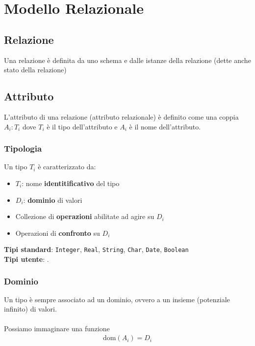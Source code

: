 \chapter{Modello Relazionale}

\section{Relazione}
Una {relazione} è definita da uno {schema} e dalle {istanze} della relazione (dette anche {stato} della relazione)

\section{Attributo}
L'attributo di una relazione (attributo relazionale) è definito come una coppia $A_i:T_i$ dove $T_i$ è il tipo dell'attributo e $A_i$ è il nome dell'attributo.

\subsection{Tipologia}
Un tipo $T_i$ è caratterizzato da:
    \begin{itemize}
        \item{$T_i$: nome \textbf{identitificativo} del tipo}
        \item{$D_i$: \textbf{dominio} di valori}
        \item{Collezione di \textbf{operazioni} abilitate ad agire su $D_i$}
        \item{Operazioni di \textbf{confronto} su $D_i$}
    \end{itemize}
\textbf{Tipi standard}: \texttt{Integer}, \texttt{Real}, \texttt{String}, \texttt{Char}, \texttt{Date}, \texttt{Boolean}\\
\textbf{Tipi utente}: .

\subsection{Dominio}
Un tipo è sempre associato ad un dominio, ovvero a un insieme (potenziale infinito) di valori.\\\\
Possiamo immaginare una funzione
    \begin{equation}\begin{aligned}
        \text{dom}(A_i) = D_i
    \end{aligned}\end{equation}

